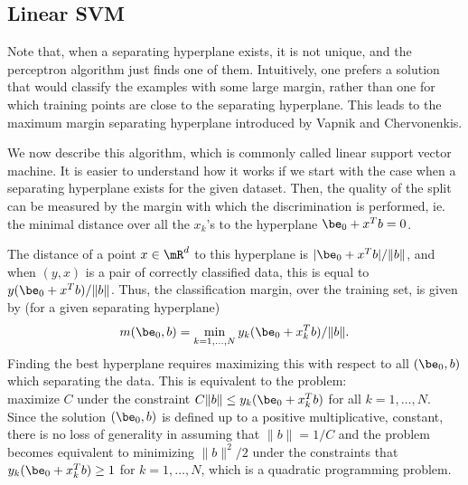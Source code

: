 \subsection{Linear SVM}
Note that, when a separating hyperplane exists, it is not unique, and
the perceptron algorithm just finds one of them. Intuitively, one
prefers a solution that would classify the examples with some large
margin, rather than one for which training points are close to the
separating hyperplane. This leads to the maximum margin separating
hyperplane introduced by
Vapnik and Chervonenkis.

We now describe this algorithm, which is commonly called linear support vector machine. It is
easier to understand how it works if we start with the case when a
separating hyperplane exists for the given dataset. Then, the quality
of the split can be measured by the margin with which the
discrimination is performed, ie. the minimal distance over all the
$x_k$'s to the hyperplane $\be_0 + x^Tb = 0$. 

The distance of a point $x\in\mR^d$ to this hyperplane is  $|\be_0 + x^Tb|/\|b\|$, and when $(y,x)$ is a pair of correctly
classified data, this is equal to $y(\be_0 + x^Tb)/\|b\|$. Thus, the
classification margin, over the training set, is given by (for a given
separating hyperplane)
$$
m(\be_0, b) = \min_{k=1, \ldots, N} y_k(\be_0 + x_k^T b)/\|b\|.
$$
Finding the best hyperplane requires maximizing this with respect to all $(\be_0, b)$
which separating the data. This is equivalent to the
problem:\\
maximize $C$ under the constraint $C\|b\| \leq y_k(\be_0 + x_k^T b)$ for
all $k=1, \ldots, N$. Since the solution $(\be_0, b)$ is defined up to
a positive multiplicative, constant, there is no loss of generality in
assuming that $\|b\| = 1/C$ and the problem becomes equivalent to
minimizing $\|b\|^2/2$ under the constraints that $y_k(\be_0 + x_k^T b)
\geq 1$ for $k=1, \ldots, N$, which is a quadratic programming problem.


